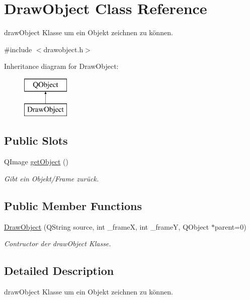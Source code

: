 \hypertarget{class_draw_object}{}\section{Draw\+Object Class Reference}
\label{class_draw_object}


draw\+Object Klasse um ein Objekt zeichnen zu können.  




{\ttfamily \#include $<$drawobject.\+h$>$}

Inheritance diagram for Draw\+Object\+:\begin{figure}[H]
\begin{center}
\leavevmode
\includegraphics[height=2.000000cm]{class_draw_object}
\end{center}
\end{figure}
\subsection*{Public Slots}
\begin{DoxyCompactItemize}
\item 
Q\+Image \hyperlink{class_draw_object_aa32cf1d16d28633a145dcf28c899a9f2}{get\+Object} ()
\begin{DoxyCompactList}\small\item\em Gibt ein Objekt/\+Frame zurück. \end{DoxyCompactList}\end{DoxyCompactItemize}
\subsection*{Public Member Functions}
\begin{DoxyCompactItemize}
\item 
\hyperlink{class_draw_object_ad2957b36afe08d84a3a4b5de876cac30}{Draw\+Object} (Q\+String source, int \+\_\+frame\+X, int \+\_\+frame\+Y, Q\+Object $\ast$parent=0)
\begin{DoxyCompactList}\small\item\em Contructor der draw\+Object Klasse. \end{DoxyCompactList}\end{DoxyCompactItemize}


\subsection{Detailed Description}
draw\+Object Klasse um ein Objekt zeichnen zu können. 

